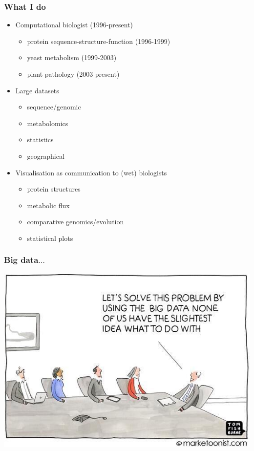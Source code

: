 
\begin{frame}
  \frametitle{What I do}
      \begin{itemize}  
        \item \textcolor{hutton_green}{Computational biologist (1996-present)}
        \begin{itemize}
          \item protein sequence-structure-function (1996-1999)
          \item yeast metabolism (1999-2003)
          \item plant pathology (2003-present)
        \end{itemize}
        \item \textcolor{hutton_blue}{Large datasets}
        \begin{itemize}
          \item sequence/genomic
          \item metabolomics
          \item statistics
          \item geographical
        \end{itemize}
        \item \textcolor{hutton_purple}{Visualisation as communication to (wet) biologists}
        \begin{itemize}
          \item protein structures
          \item metabolic flux
          \item comparative genomics/evolution
          \item statistical plots
        \end{itemize}
      \end{itemize}  
\end{frame}

\begin{frame}
  \frametitle{Big data$\ldots$
  }
  \begin{center}
    \includegraphics[height=0.7\textheight,valign=t]{images/big_data}    
  \end{center}
\end{frame}

